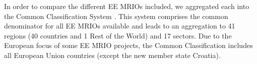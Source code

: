 In order to compare the different EE MRIOs included, we aggregated each into the Common Classification System \cite{Steen_Olsen_2014}. This system comprises the common denominator for all EE MRIOs available and leads to an aggregation to 41 regions (40 countries and 1 Rest of the World) and 17 sectors. Due to the European focus of some EE MRIO projects, the Common Classification includes all European Union countries (except the new member state Croatia).
